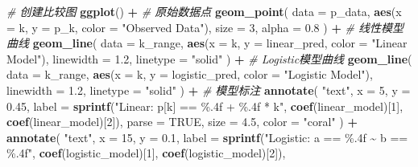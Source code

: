 \documentclass[
]{article}
\newenvironment{Shaded}{\begin{snugshade}}{\end{snugshade}}
\newcommand{\AttributeTok}[1]{\textcolor[rgb]{0.13,0.29,0.53}{#1}}
\newcommand{\CommentTok}[1]{\textcolor[rgb]{0.56,0.35,0.01}{\textit{#1}}}
\newcommand{\ConstantTok}[1]{\textcolor[rgb]{0.56,0.35,0.01}{#1}}
\newcommand{\DecValTok}[1]{\textcolor[rgb]{0.00,0.00,0.81}{#1}}
\newcommand{\FloatTok}[1]{\textcolor[rgb]{0.00,0.00,0.81}{#1}}
\newcommand{\FunctionTok}[1]{\textcolor[rgb]{0.13,0.29,0.53}{\textbf{#1}}}
\newcommand{\NormalTok}[1]{#1}
\newcommand{\SpecialCharTok}[1]{\textcolor[rgb]{0.81,0.36,0.00}{\textbf{#1}}}
\newcommand{\StringTok}[1]{\textcolor[rgb]{0.31,0.60,0.02}{#1}}
\begin{document}
\begin{Shaded}
\begin{Highlighting}[]
\CommentTok{\# 创建比较图}
\FunctionTok{ggplot}\NormalTok{() }\SpecialCharTok{+}
  \CommentTok{\# 原始数据点}
  \FunctionTok{geom\_point}\NormalTok{(}
    \AttributeTok{data =}\NormalTok{ p\_data, }
    \FunctionTok{aes}\NormalTok{(}\AttributeTok{x =}\NormalTok{ k, }\AttributeTok{y =}\NormalTok{ p\_k, }\AttributeTok{color =} \StringTok{"Observed Data"}\NormalTok{),}
    \AttributeTok{size =} \DecValTok{3}\NormalTok{, }
    \AttributeTok{alpha =} \FloatTok{0.8}
\NormalTok{  ) }\SpecialCharTok{+}
  \CommentTok{\# 线性模型曲线}
  \FunctionTok{geom\_line}\NormalTok{(}
    \AttributeTok{data =}\NormalTok{ k\_range,}
    \FunctionTok{aes}\NormalTok{(}\AttributeTok{x =}\NormalTok{ k, }\AttributeTok{y =}\NormalTok{ linear\_pred, }\AttributeTok{color =} \StringTok{"Linear Model"}\NormalTok{),}
    \AttributeTok{linewidth =} \FloatTok{1.2}\NormalTok{,}
    \AttributeTok{linetype =} \StringTok{"solid"}
\NormalTok{  ) }\SpecialCharTok{+}
  \CommentTok{\# Logistic模型曲线}
  \FunctionTok{geom\_line}\NormalTok{(}
    \AttributeTok{data =}\NormalTok{ k\_range,}
    \FunctionTok{aes}\NormalTok{(}\AttributeTok{x =}\NormalTok{ k, }\AttributeTok{y =}\NormalTok{ logistic\_pred, }\AttributeTok{color =} \StringTok{"Logistic Model"}\NormalTok{),}
    \AttributeTok{linewidth =} \FloatTok{1.2}\NormalTok{,}
    \AttributeTok{linetype =} \StringTok{"solid"}
\NormalTok{  ) }\SpecialCharTok{+}
  \CommentTok{\# 模型标注}
  \FunctionTok{annotate}\NormalTok{(}
    \StringTok{"text"}\NormalTok{,}
    \AttributeTok{x =} \DecValTok{5}\NormalTok{,}
    \AttributeTok{y =} \FloatTok{0.45}\NormalTok{,}
    \AttributeTok{label =} \FunctionTok{sprintf}\NormalTok{(}\StringTok{"Linear: p[k] == \%.4f + \%.4f * k"}\NormalTok{, }
                   \FunctionTok{coef}\NormalTok{(linear\_model)[}\DecValTok{1}\NormalTok{], }
                   \FunctionTok{coef}\NormalTok{(linear\_model)[}\DecValTok{2}\NormalTok{]),}
    \AttributeTok{parse =} \ConstantTok{TRUE}\NormalTok{,}
    \AttributeTok{size =} \FloatTok{4.5}\NormalTok{,}
    \AttributeTok{color =} \StringTok{"coral"}
\NormalTok{  ) }\SpecialCharTok{+}
  \FunctionTok{annotate}\NormalTok{(}
    \StringTok{"text"}\NormalTok{,}
    \AttributeTok{x =} \DecValTok{15}\NormalTok{,}
    \AttributeTok{y =} \FloatTok{0.1}\NormalTok{,}
    \AttributeTok{label =} \FunctionTok{sprintf}\NormalTok{(}\StringTok{"Logistic: a == \%.4f \textasciitilde{} b == \%.4f"}\NormalTok{, }
                   \FunctionTok{coef}\NormalTok{(logistic\_model)[}\DecValTok{1}\NormalTok{], }
                   \FunctionTok{coef}\NormalTok{(logistic\_model)[}\DecValTok{2}\NormalTok{]),}

\end{Highlighting}
\end{Shaded}
\end{document}
